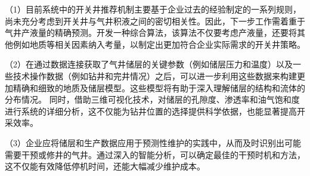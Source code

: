 （1）目前系统中的开关井推荐机制主要基于企业过去的经验制定的一系列规则，尚未充分考虑到开关井与气井积液之间的密切相关性。因此，下一步工作需着重于气井产液量的精确预测。开发一种综合算法，该算法不仅要考虑产液量，还要将其他例如地质等相关因素纳入考量，以制定出更加符合企业实际需求的开关井策略。

（2）在通过数据连接获取了气井储层的关键参数（例如储层压力和温度）以及一些技术操作数据（例如钻井和完井情况）之后，可以进一步利用这些数据来构建更加精确和细致的地质及储层模型。这些模型将有助于深入理解储层的结构和流体的分布情况。
同时，借助三维可视化技术，对储层的孔隙度、渗透率和油气饱和度进行系统的详细分析，这不仅能为钻井位置的选择提供科学依据，也能显著提高开采效率。

（3）企业应将储层和生产数据应用于预测性维护的实践中，从而及时识别出可能需要干预或修井的气井。通过深入的智能分析，可以确定最佳的干预时机和方法，这不仅能有效降低停机时间，还能大幅减少维护成本。